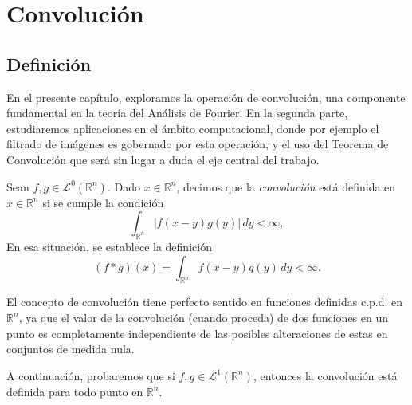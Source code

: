 \chapter{Convolución}

\section{Definición}
En el presente capítulo, exploramos la operación de convolución, una componente fundamental en la teoría del Análisis de Fourier. En la segunda parte, estudiaremos aplicaciones en el ámbito computacional, donde por ejemplo el filtrado de imágenes es gobernado por esta operación, y el uso del Teorema de Convolución que será sin lugar a duda el eje central del trabajo. 

\begin{definicion}
Sean $f,g  \in \mathscr{L}^0(\mathbb{R}^n)$. Dado $x \in \mathbb{R}^n$, decimos que la \textit{convolución} está definida en $x\in \mathbb{R}^n$ si se cumple la condición 
\begin{equation}
    \int_{\mathbb{R}^n} |f(x-y)g(y)| \, dy < \infty,
\end{equation}
En esa situación, se establece la definición
\begin{equation}
    (f*g)(x) = \int_{\mathbb{R}^n} f(x-y)g(y) \, dy < \infty.
\end{equation}
\end{definicion}

\begin{observacion}
  El concepto de convolución tiene perfecto sentido en funciones definidas c.p.d. en $\mathbb{R}^n$, ya que el valor de la convolución (cuando proceda) de dos funciones en un punto es completamente independiente de las posibles alteraciones de estas en conjuntos de medida nula.
\end{observacion}

\noindent A continuación, probaremos que si $f,g \in \mathscr{L}^1(\mathbb{R}^n)$, entonces la convolución está definida para todo punto en $\mathbb{R}^n$.

